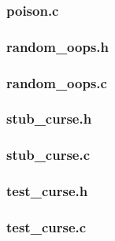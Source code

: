 \documentclass[a4paper,11pt]{article} \usepackage{anysize}
\begin{document}
\subsubsection*{poison.c}


\subsubsection*{random\_oops.h}

\subsubsection*{random\_oops.c}


\subsubsection*{stub\_curse.h}

\subsubsection*{stub\_curse.c}


\subsubsection*{test\_curse.h}

\subsubsection*{test\_curse.c}

\end{document}
